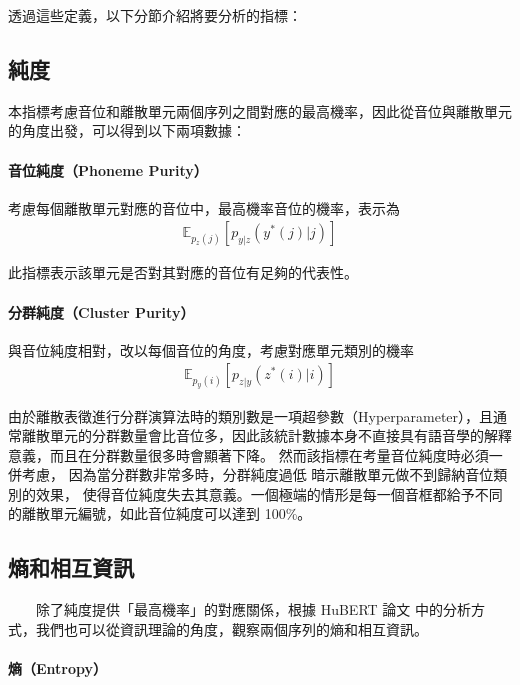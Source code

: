 透過這些定義，以下分節介紹將要分析的指標：

\subsection{純度}

        本指標考慮音位和離散單元兩個序列之間對應的最高機率，因此從音位與離散單元的角度出發，可以得到以下兩項數據：

\paragraph{音位純度（Phoneme Purity）}

        考慮每個離散單元對應的音位中，最高機率音位的機率，表示為
    \begin{align}
      \mathbb{E}_{p_z(j)}\left[p_{y|z}(y^*(j)|j) \right]
    \end{align}

此指標表示該單元是否對其對應的音位有足夠的代表性。

\paragraph{分群純度（Cluster Purity）}

        與音位純度相對，改以每個音位的角度，考慮對應單元類別的機率
    \begin{align}
      \mathbb{E}_{p_y(i)}\left[p_{z|y}(z^*(i)|i) \right]
    \end{align}

        由於離散表徵進行分群演算法時的類別數是一項超參數（Hyperparameter），且通常離散單元的分群數量會比音位多，因此該統計數據本身不直接具有語音學的解釋意義，而且在分群數量很多時會顯著下降。
然而該指標在考量音位純度時必須一併考慮，
因為當分群數非常多時，分群純度過低
暗示離散單元做不到歸納音位類別的效果，
使得音位純度失去其意義。一個極端的情形是每一個音框都給予不同的離散單元編號，如此音位純度可以達到
         100\%。

\subsection{熵和相互資訊}

　　除了純度提供「最高機率」的對應關係，根據 HuBERT 論文 \cite{hsu_hubert_2021-2} 中的分析方式，我們也可以從資訊理論的角度，觀察兩個序列的熵和相互資訊。

\paragraph{熵（Entropy）}

